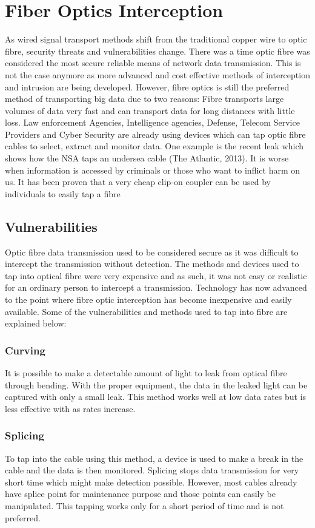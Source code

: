 \documentclass{article}
\begin{document}
\section{Fiber Optics Interception}
As wired signal transport methods shift from the traditional copper wire to optic fibre, security threats and vulnerabilities change. There was a time optic fibre was considered the most secure reliable means of network data transmission. This is not the case anymore as more advanced and cost effective methods of interception and intrusion are being developed. However, fibre optics is still the preferred method of transporting big data due to two reasons: Fibre transports large volumes of data very fast and can transport data for long distances with little loss. Law enforcement Agencies, Intelligence agencies, Defense, Telecom Service Providers and Cyber Security are already using devices which can tap optic fibre cables to select, extract and monitor data. One example is the recent leak which shows how the NSA taps an undersea cable (The Atlantic, 2013). It is worse when information is accessed by criminals or those who want to inflict harm on us. It has been proven that a very cheap clip-on coupler can be used by individuals to easily tap a fibre \cite{opterna}

\subsection{Vulnerabilities}
Optic fibre data transmission used to be considered secure as it was difficult to intercept the transmission without detection. The methods and devices used to tap into optical fibre were very expensive and as such, it was not easy or realistic for an ordinary person to intercept a transmission. Technology has now advanced to the point where fibre optic interception has become inexpensive and easily available. Some of the vulnerabilities and methods used to tap into fibre are explained below:

\subsubsection{Curving}
It is possible to make a detectable amount of light to leak from optical fibre through bending. With the proper equipment, the data in the leaked light can be captured with only a small leak. This method works well at low data rates but is less effective with as rates increase. \cite{sans} 

\subsubsection{Splicing}
To tap into the cable using this method, a device is used to make a break in the cable and the data is then monitored. Splicing stops data transmission for very short time which might make detection possible. However, most cables already have splice point for maintenance purpose and those points can easily be manipulated. This tapping works only for a short period of time and is not preferred. \cite{sans}
\end{document}
